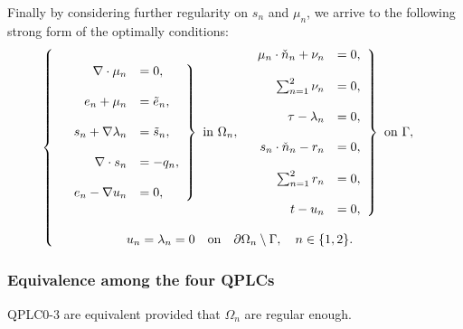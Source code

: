 Finally by considering further regularity on $s_n$ and $\mu_n$, we arrive to the following strong form of the optimally conditions:
\begin{equation}
\left\lbrace
\begin{array}{c}
\begin{array}{c c}
\left.
\begin{array}{rl}
	\nabla \cdot \mu_n     &= 0,\\
    \\
    e_n + \mu_n            &= \tilde{e}_n,\\
    \\
    s_n + \nabla \lambda_n &= \tilde{s}_n,\\
	  \\
	\nabla \cdot s_n       &=-q_n,\\
    \\
    e_n - \nabla u_n       &= 0,
\end{array}
\right\rbrace \textrm{ in } \Omega_n,
&
\left.
\begin{array}{rl}
	  \mu_n\cdot\check{n}_n + \nu_n  &= 0,\\
    \\
    \sum_{n = 1}^2 \nu_n &= 0,\\
    \\
    \tau-\lambda_n                 &= 0,\\ 
    \\
    s_n\cdot\check{n}_n - r_n      &= 0,\\
    \\
    \sum_{n = 1}^2 r_n   &= 0,\\
    \\
    t - u_n                        &= 0, 
\end{array}
\right\rbrace \textrm{ on } \Gamma,
\end{array}
\\
\\
u_n = \lambda_n = 0 \quad \textrm{on} \quad \partial \Omega_n \setminus \Gamma, \quad n \in \{ 1,2\}.
\end{array}
\right. 
\end{equation}

\subsubsection{Equivalence among the four QPLCs}

\begin{proposition}
    QPLC0-3 are equivalent provided that $\Omega_n$ are regular enough.     
\end{proposition}


